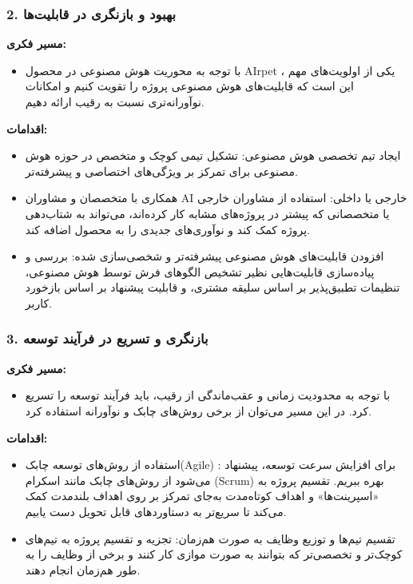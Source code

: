 \subsubsection*{2. بهبود و بازنگری در قابلیت‌ها}

\textbf{مسیر فکری:}

\begin{itemize}
    \item با توجه به محوریت هوش مصنوعی در محصول AIrpet ، یکی از اولویت‌های مهم این است که قابلیت‌های هوش مصنوعی پروژه را تقویت کنیم و امکانات نوآورانه‌تری نسبت به رقیب ارائه دهیم.
\end{itemize}

\textbf{اقدامات:}

\begin{itemize}
    \item ایجاد تیم تخصصی هوش مصنوعی: تشکیل تیمی کوچک و متخصص در حوزه هوش مصنوعی برای تمرکز بر ویژگی‌های اختصاصی و پیشرفته‌تر.
    \item همکاری با متخصصان و مشاوران AI خارجی یا داخلی: استفاده از مشاوران خارجی یا متخصصانی که پیشتر در پروژه‌های مشابه کار کرده‌اند، می‌تواند به شتاب‌دهی پروژه کمک کند و نوآوری‌های جدیدی را به محصول اضافه کند.
    \item افزودن قابلیت‌های هوش مصنوعی پیشرفته‌تر و شخصی‌سازی شده: بررسی و پیاده‌سازی قابلیت‌هایی نظیر تشخیص الگوهای فرش توسط هوش مصنوعی، تنظیمات تطبیق‌پذیر بر اساس سلیقه مشتری، و قابلیت پیشنهاد بر اساس بازخورد کاربر.
\end{itemize}


\subsubsection*{3. بازنگری و تسریع در فرآیند توسعه}

\textbf{مسیر فکری:}

\begin{itemize}
    \item با توجه به محدودیت زمانی و عقب‌ماندگی از رقیب، باید فرآیند توسعه را تسریع کرد. در این مسیر می‌توان از برخی روش‌های چابک و نوآورانه استفاده کرد.
\end{itemize}

\textbf{اقدامات:}

\begin{itemize}
    \item استفاده از روش‌های توسعه چابک(Agile) : برای افزایش سرعت توسعه، پیشنهاد می‌شود از روش‌های چابک مانند اسکرام (Scrum) بهره ببریم. تقسیم پروژه به «اسپرینت‌ها» و اهداف کوتاه‌مدت به‌جای تمرکز بر روی اهداف بلندمدت کمک می‌کند تا سریع‌تر به دستاوردهای قابل تحویل دست یابیم.
    \item تقسیم تیم‌ها و توزیع وظایف به صورت هم‌زمان: تجزیه و تقسیم پروژه به تیم‌های کوچک‌تر و تخصصی‌تر که بتوانند به صورت موازی کار کنند و برخی از وظایف را به طور هم‌زمان انجام دهند.
\end{itemize}


